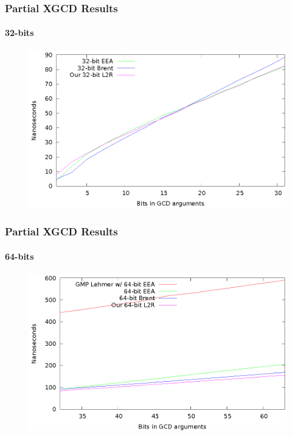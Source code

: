 \documentclass{beamer}
\begin{document}
\begin{frame}
\frametitle{Partial XGCD Results}
\framesubtitle{32-bits}
\begin{figure}
\includegraphics[scale=0.86]{best-partial-32-2}
\end{figure}
\end{frame}
\begin{frame}
\frametitle{Partial XGCD Results}
\framesubtitle{64-bits}
\begin{figure}
\includegraphics[scale=0.86]{best-partial-64}
\end{figure}
\end{frame}
\end{document}

